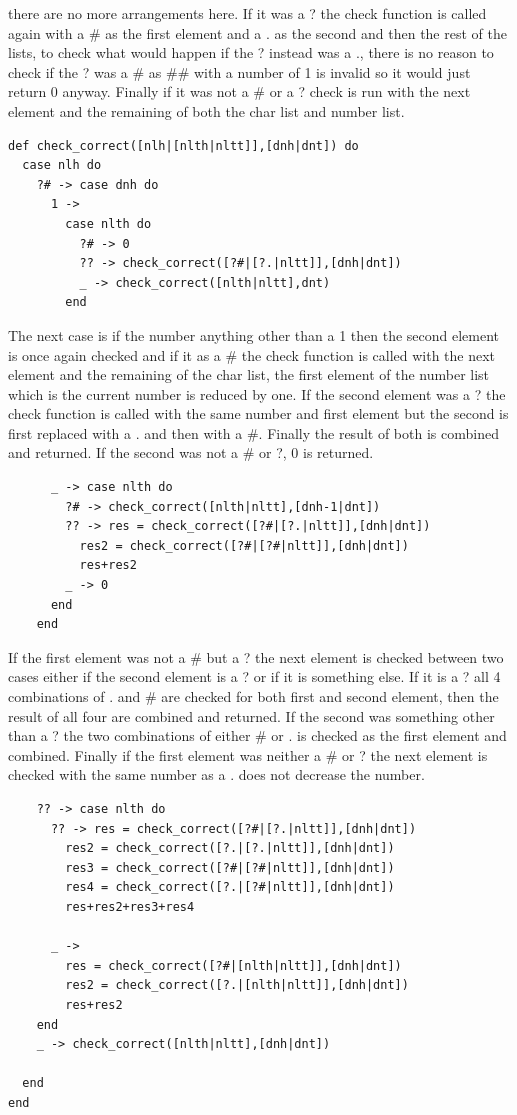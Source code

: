 \documentclass[a4paper,11pt]{article}
\begin{document}
there are no more arrangements here. If it was a ? the check function is called again with a \# as the first element and a . as the second and then the rest of the lists, to check what would happen if the ? instead was a ., there is no reason to check if the ? was a \# as \#\# with a number of 1 is invalid so it would just return 0 anyway. Finally if it was not a \# or a ? check is run with the next element and the remaining of both the char list and number list. 
\begin{verbatim}
def check_correct([nlh|[nlth|nltt]],[dnh|dnt]) do
  case nlh do
    ?# -> case dnh do
      1 ->
        case nlth do
          ?# -> 0
          ?? -> check_correct([?#|[?.|nltt]],[dnh|dnt])
          _ -> check_correct([nlth|nltt],dnt)
        end
\end{verbatim}
The next case is if the number anything other than a 1 then the second element is once again checked and if it as a \# the check function is called with the next element and the remaining of the char list, the first element of the number list which is the current number is reduced by one. If the second element was a ? the check function is called with the same number and first element but the second is first replaced with a . and then with a \#. Finally the result of both is combined and returned. If the second was not a \# or ?, 0 is returned.
\begin{verbatim}
      _ -> case nlth do
        ?# -> check_correct([nlth|nltt],[dnh-1|dnt])
        ?? -> res = check_correct([?#|[?.|nltt]],[dnh|dnt])
          res2 = check_correct([?#|[?#|nltt]],[dnh|dnt])
          res+res2
        _ -> 0
      end
    end
\end{verbatim} 
If the first element was not a \# but a ? the next element is checked between two cases either if the second element is a ? or if it is something else. If it is a ? all 4 combinations of . and \# are checked for both first and second element, then the result of all four are combined and returned. If the second was something other than a ? the two combinations of either \# or . is checked as the first element and combined. 
Finally if the first element was neither a \# or ? the next element is checked with the same number as a . does not decrease the number.
\begin{verbatim}
    ?? -> case nlth do
      ?? -> res = check_correct([?#|[?.|nltt]],[dnh|dnt])
        res2 = check_correct([?.|[?.|nltt]],[dnh|dnt])
        res3 = check_correct([?#|[?#|nltt]],[dnh|dnt])
        res4 = check_correct([?.|[?#|nltt]],[dnh|dnt])
        res+res2+res3+res4

      _ ->
        res = check_correct([?#|[nlth|nltt]],[dnh|dnt])
        res2 = check_correct([?.|[nlth|nltt]],[dnh|dnt])
        res+res2
    end
    _ -> check_correct([nlth|nltt],[dnh|dnt])

  end
end  
\end{verbatim}
\end{document}
